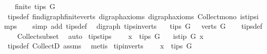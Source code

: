 \begin{isabellebody}
\ \ \ {\isachardoublequoteopen}finite\ {\isacharparenleft}{\kern0pt}tips\ G{\isacharparenright}{\kern0pt}{\isachardoublequoteclose}\isanewline
%
\isadelimproof
\ \ %
\endisadelimproof
%
\isatagproof
{}\isamarkupfalse%
\ tips{\isacharunderscore}{\kern0pt}def\ fin{\isacharunderscore}{\kern0pt}digraph{\isachardot}{\kern0pt}finite{\isacharunderscore}{\kern0pt}verts\ digraph{\isachardot}{\kern0pt}axioms{\isacharparenleft}{\kern0pt}{}{\isacharparenright}{\kern0pt}\ digraph{\isacharunderscore}{\kern0pt}axioms\ Collect{\isacharunderscore}{\kern0pt}mono\ is{\isacharunderscore}{\kern0pt}tip{\isachardot}{\kern0pt}simps\isanewline
\ \ \isamarkupfalse%
\ {\isacharparenleft}{\kern0pt}simp\ add{\isacharcolon}{\kern0pt}\ tips{\isacharunderscore}{\kern0pt}def{\isacharparenright}{\kern0pt}%
\endisatagproof
{\isafoldproof}%
%
\isadelimproof
\isanewline
%
\endisadelimproof
\isanewline
{}\isamarkupfalse%
\ {\isacharparenleft}{\kern0pt}\ digraph{\isacharparenright}{\kern0pt}\ tips{\isacharunderscore}{\kern0pt}in{\isacharunderscore}{\kern0pt}verts{\isacharcolon}{\kern0pt}\isanewline
\ \ \ {\isachardoublequoteopen}tips\ G\ {\isasymsubseteq}\ \ verts\ G{\isachardoublequoteclose}%
\isadelimproof
\ \ %
\endisadelimproof
%
\isatagproof
{}\isamarkupfalse%
\ tips{\isacharunderscore}{\kern0pt}def\isanewline
\ \ \isamarkupfalse%
\ Collect{\isacharunderscore}{\kern0pt}subset\ \isamarkupfalse%
\ auto%
\endisatagproof
{\isafoldproof}%
%
\isadelimproof
%
\endisadelimproof
\isanewline
\isanewline
{}\isamarkupfalse%
\ tips{\isacharunderscore}{\kern0pt}tips{\isacharcolon}{\kern0pt}\ \isanewline
\ \ \ {\isachardoublequoteopen}x\ {\isasymin}\ tips\ G{\isachardoublequoteclose}\isanewline
\ \ \ {\isachardoublequoteopen}is{\isacharunderscore}{\kern0pt}tip\ G\ x{\isachardoublequoteclose}%
\isadelimproof
\ %
\endisadelimproof
%
\isatagproof
{}\isamarkupfalse%
\ tips{\isacharunderscore}{\kern0pt}def\ CollectD\ assms{\isacharparenleft}{\kern0pt}{}{\isacharparenright}{\kern0pt}\ \isamarkupfalse%
\ metis%
\endisatagproof
{\isafoldproof}%
%
\isadelimproof
%
\endisadelimproof
\isanewline
\isanewline
{}\isamarkupfalse%
\ tip{\isacharunderscore}{\kern0pt}in{\isacharunderscore}{\kern0pt}verts{\isacharcolon}{\kern0pt}\ \isanewline
\ \ \ {\isachardoublequoteopen}x\ {\isasymin}\ tips\ G{\isachardoublequoteclose}\isanewline

\end{isabellebody}
